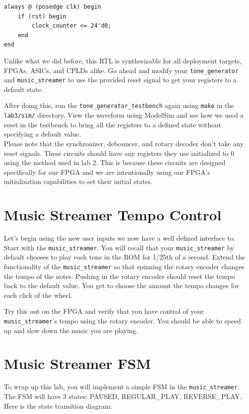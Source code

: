 \documentclass[11pt]{article}
\begin{document}
\begin{verbatim}
always @ (posedge clk) begin
	if (rst) begin
		clock_counter <= 24'd0;
	end
end
\end{verbatim}

Unlike what we did before, this RTL is synthesizable for all deployment targets, FPGAs, ASICs, and CPLDs alike. Go ahead and modify your \verb|tone_generator| and \verb|music_streamer| to use the provided reset signal to get your registers to a default state.

After doing this, run the \verb|tone_generator_testbench| again using \verb|make| in the \verb|lab3/sim/| directory. View the waveform using ModelSim and see how we used a reset in the testbench to bring all the registers to a defined state without specifying a default value.\\

Please note that the synchronizer, debouncer, and rotary decoder don't take any reset signals. These circuits should have any registers they use initialized to 0 using the method used in lab 2. This is because these circuits are designed specifically for our FPGA and we are intentionally using our FPGA's initialization capabilities to set their initial states.

\section{Music Streamer Tempo Control}
Let's begin using the new user inputs we now have a well defined interface to. Start with the \verb|music_streamer|. You will recall that your \verb|music_streamer| by default chooses to play each tone in the ROM for 1/25th of a second. Extend the functionality of the \verb|music_streamer| so that spinning the rotary encoder changes the tempo of the notes. Pushing in the rotary encoder should reset the tempo back to the default value. You get to choose the amount the tempo changes for each click of the wheel.

Try this out on the FPGA and verify that you have control of your \verb|music_streamer|'s tempo using the rotary encoder. You should be able to speed up and slow down the music you are playing.

\section{Music Streamer FSM}
To wrap up this lab, you will implement a simple FSM in the \verb|music_streamer|. The FSM will have 3 states: PAUSED, REGULAR\_PLAY, REVERSE\_PLAY. Here is the state transition diagram:
\end{document}
